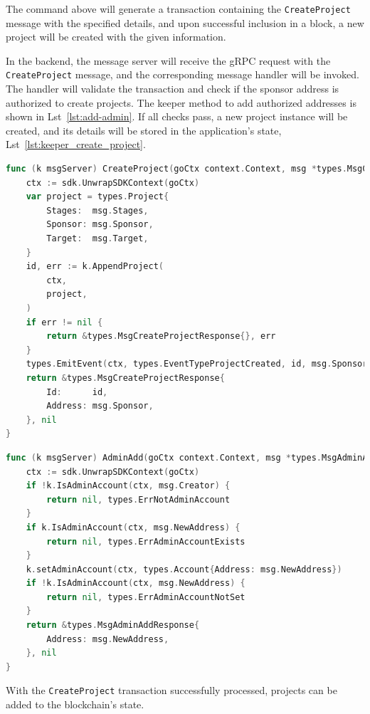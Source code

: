 The command above will generate a transaction containing the \texttt{CreateProject} message with the specified details, and upon successful inclusion in a block, a new project will be created with the given information.

In the backend, the message server will receive the gRPC request with the \texttt{CreateProject} message, and the corresponding message handler will be invoked. The handler will validate the transaction and check if the sponsor address is authorized to create projects. The keeper method to add authorized addresses is shown in Lst~\ref{lst:add-admin}. If all checks pass, a new project instance will be created, and its details will be stored in the application's state, Lst~\ref{lst:keeper_create_project}.

\newpage

\begin{lstlisting}[language=go, caption=Keeper implementation for CreateProject,label={lst:keeper_create_project}]
func (k msgServer) CreateProject(goCtx context.Context, msg *types.MsgCreateProject) (*types.MsgCreateProjectResponse, error) {
	ctx := sdk.UnwrapSDKContext(goCtx)
	var project = types.Project{
		Stages:  msg.Stages,
		Sponsor: msg.Sponsor,
		Target:  msg.Target,
	}
	id, err := k.AppendProject(
		ctx,
		project,
	)
	if err != nil {
		return &types.MsgCreateProjectResponse{}, err
	}
	types.EmitEvent(ctx, types.EventTypeProjectCreated, id, msg.Sponsor)
	return &types.MsgCreateProjectResponse{
		Id:      id,
		Address: msg.Sponsor,
	}, nil
}
\end{lstlisting}

\begin{lstlisting}[language=go, caption=Keeper implementation for CreateProject,label={lst:add-admin}]
func (k msgServer) AdminAdd(goCtx context.Context, msg *types.MsgAdminAdd) (*types.MsgAdminAddResponse, error) {
	ctx := sdk.UnwrapSDKContext(goCtx)
	if !k.IsAdminAccount(ctx, msg.Creator) {
		return nil, types.ErrNotAdminAccount
	}
	if k.IsAdminAccount(ctx, msg.NewAddress) {
		return nil, types.ErrAdminAccountExists
	}
	k.setAdminAccount(ctx, types.Account{Address: msg.NewAddress})
	if !k.IsAdminAccount(ctx, msg.NewAddress) {
		return nil, types.ErrAdminAccountNotSet
	}
	return &types.MsgAdminAddResponse{
		Address: msg.NewAddress,
	}, nil
}
\end{lstlisting}

With the \texttt{CreateProject} transaction successfully processed, projects can be added to the blockchain's state.

